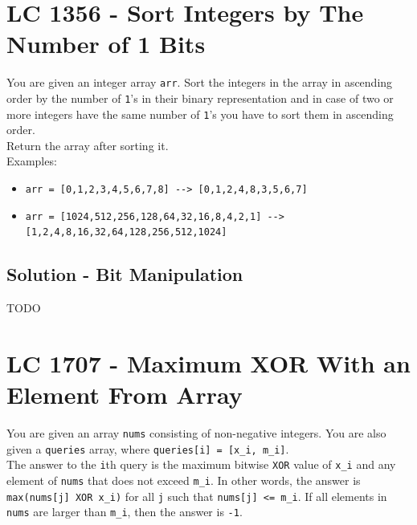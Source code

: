 \section{LC 1356 - Sort Integers by The Number of 1 Bits}
You are given an integer array {\colorbox{CodeBackground}{\lstinline|arr|}}. Sort the integers in the array in ascending order by the number of {\colorbox{CodeBackground}{\lstinline|1|}}'s in their binary representation and in case of two or more integers have the same number of {\colorbox{CodeBackground}{\lstinline|1|}}'s you have to sort them in ascending order.\\

Return the array after sorting it.\\

Examples:
\begin{itemize}
\item {\colorbox{CodeBackground}{\lstinline|arr = [0,1,2,3,4,5,6,7,8] --> [0,1,2,4,8,3,5,6,7]|}}
\item {\colorbox{CodeBackground}{\lstinline|arr = [1024,512,256,128,64,32,16,8,4,2,1] --> [1,2,4,8,16,32,64,128,256,512,1024]|}}
\end{itemize}

\subsection*{Solution - Bit Manipulation}
TODO

\section{LC 1707 - Maximum XOR With an Element From Array}
You are given an array {\colorbox{CodeBackground}{\lstinline|nums|}} consisting of non-negative integers. You are also given a {\colorbox{CodeBackground}{\lstinline|queries|}} array, where {\colorbox{CodeBackground}{\lstinline|queries[i] = [x_i, m_i]|}}.\\

The answer to the {\colorbox{CodeBackground}{\lstinline|i|}}th query is the maximum bitwise {\colorbox{CodeBackground}{\lstinline|XOR|}} value of {\colorbox{CodeBackground}{\lstinline|x_i|}} and any element of {\colorbox{CodeBackground}{\lstinline|nums|}} that does not exceed {\colorbox{CodeBackground}{\lstinline|m_i|}}. In other words, the answer is {\colorbox{CodeBackground}{\lstinline|max(nums[j] XOR x_i)|}} for all {\colorbox{CodeBackground}{\lstinline|j|}} such that {\colorbox{CodeBackground}{\lstinline|nums[j] <= m_i|}}. If all elements in {\colorbox{CodeBackground}{\lstinline|nums|}} are larger than {\colorbox{CodeBackground}{\lstinline|m_i|}}, then the answer is {\colorbox{CodeBackground}{\lstinline|-1|}}.\\

